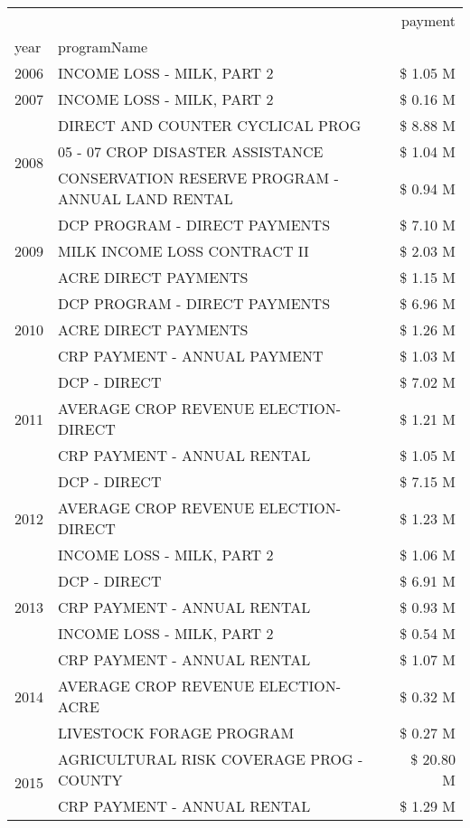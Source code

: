 \begin{tabular}{llr}
\toprule
 &  & payment \\
year & programName &  \\
\midrule
2006 & INCOME LOSS - MILK, PART 2 & \$ 1.05 M \\
\cline{1-3}
2007 & INCOME LOSS - MILK, PART 2 & \$ 0.16 M \\
\cline{1-3}
\multirow[t]{3}{*}{2008} & DIRECT AND COUNTER CYCLICAL PROG & \$ 8.88 M \\
 & 05 - 07 CROP DISASTER ASSISTANCE & \$ 1.04 M \\
 & CONSERVATION RESERVE PROGRAM - ANNUAL LAND RENTAL & \$ 0.94 M \\
\cline{1-3}
\multirow[t]{3}{*}{2009} & DCP PROGRAM - DIRECT PAYMENTS & \$ 7.10 M \\
 & MILK INCOME LOSS CONTRACT II & \$ 2.03 M \\
 & ACRE DIRECT PAYMENTS & \$ 1.15 M \\
\cline{1-3}
\multirow[t]{3}{*}{2010} & DCP PROGRAM - DIRECT PAYMENTS & \$ 6.96 M \\
 & ACRE DIRECT PAYMENTS & \$ 1.26 M \\
 & CRP PAYMENT - ANNUAL PAYMENT & \$ 1.03 M \\
\cline{1-3}
\multirow[t]{3}{*}{2011} & DCP - DIRECT & \$ 7.02 M \\
 & AVERAGE CROP REVENUE ELECTION-DIRECT & \$ 1.21 M \\
 & CRP PAYMENT - ANNUAL RENTAL & \$ 1.05 M \\
\cline{1-3}
\multirow[t]{3}{*}{2012} & DCP - DIRECT & \$ 7.15 M \\
 & AVERAGE CROP REVENUE ELECTION-DIRECT & \$ 1.23 M \\
 & INCOME LOSS - MILK, PART 2 & \$ 1.06 M \\
\cline{1-3}
\multirow[t]{3}{*}{2013} & DCP - DIRECT & \$ 6.91 M \\
 & CRP PAYMENT - ANNUAL RENTAL & \$ 0.93 M \\
 & INCOME LOSS - MILK, PART 2 & \$ 0.54 M \\
\cline{1-3}
\multirow[t]{3}{*}{2014} & CRP PAYMENT - ANNUAL RENTAL & \$ 1.07 M \\
 & AVERAGE CROP REVENUE ELECTION-ACRE & \$ 0.32 M \\
 & LIVESTOCK FORAGE PROGRAM & \$ 0.27 M \\
\cline{1-3}
\multirow[t]{3}{*}{2015} & AGRICULTURAL RISK COVERAGE PROG - COUNTY & \$ 20.80 M \\
 & CRP PAYMENT - ANNUAL RENTAL & \$ 1.29 M \\

\end{tabular}
